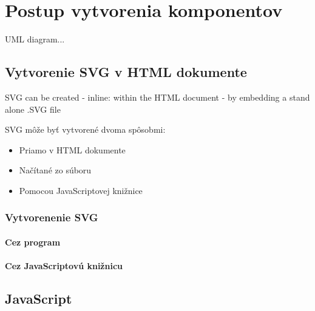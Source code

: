 \chapter{Postup vytvorenia komponentov}

UML diagram... 

\section{Vytvorenie SVG v HTML dokumente}

SVG can be created 
-   inline: within the HTML document 
-   by embedding a stand alone .SVG file

SVG môže byť vytvorené dvoma spôsobmi:
\begin{itemize}
	\item Priamo v HTML dokumente
	\item Načítané zo súboru
	\item Pomocou JavaScriptovej knižnice
\end{itemize}


 \subsection{Vytvorenenie SVG }
 
 \subsubsection{Cez program}
 
 \subsubsection{Cez JavaScriptovú knižnicu}



\section{JavaScript}